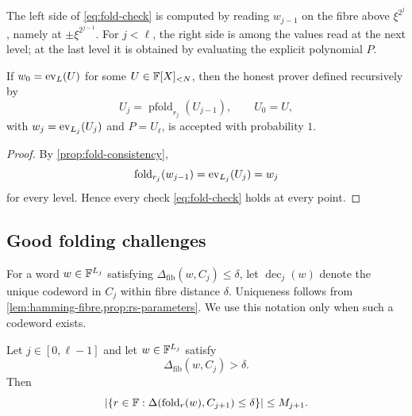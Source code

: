 The left side of \eqref{eq:fold-check} is computed by reading $w_{j-1}$ on the fibre above $\xi^{2^j}$, namely at $\pm\xi^{2^{j-1}}$.  For $j<\ell$, the right side is among the values read at the next level; at the last level it is obtained by evaluating the explicit polynomial $P$.

\begin{proposition}
\label{prop:folding-completeness}
If $w_0=\operatorname{ev}_L(U)$ for some $U\in\mathbb{F}[X]_{<N}$, then the honest prover defined recursively by
\[
  U_j=\operatorname{pfold}_{r_j}(U_{j-1}),
  \qquad U_0=U,
\]
with $w_j=\operatorname{ev}_{L_j}(U_j)$ and $P=U_\ell$, is accepted with probability $1$.
\end{proposition}

\begin{proof}
By \cref{prop:fold-consistency},
\[
  \operatorname{fold}_{r_j}(w_{j-1})
  =\operatorname{ev}_{L_j}(U_j)=w_j
\]
for every level.  Hence every check \eqref{eq:fold-check} holds at every point.
\end{proof}

\subsection{Good folding challenges}
\label{sec:good-folding-challenges}

For a word $w\in\mathbb{F}^{L_j}$ satisfying $\Delta_{\mathrm{fib}}(w,C_j)\le\delta$, let $\operatorname{dec}_j(w)$ denote the unique codeword in $C_j$ within fibre distance $\delta$.  Uniqueness follows from \cref{lem:hamming-fibre,prop:rs-parameters}.  We use this notation only when such a codeword exists.

\begin{lemma}
\label{lem:folding-far-word}
Let $j\in[0,\ell-1]$ and let $w\in\mathbb{F}^{L_j}$ satisfy
\[
  \Delta_{\mathrm{fib}}(w,C_j)>\delta.
\]
Then
\begin{equation}
  \left|
    \left\{r\in\mathbb{F}:
      \Delta(\operatorname{fold}_r(w),C_{j+1})\le\delta
    \right\}
  \right|
  \le M_{j+1}.
  \label{eq:folding-far-word-bound}
\end{equation}
\end{lemma}

